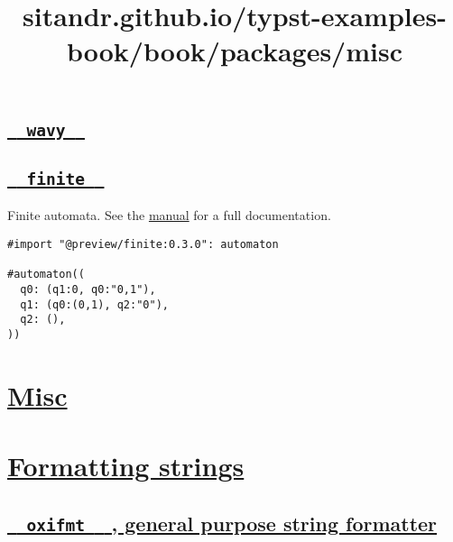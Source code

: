 \pandocbounded{}

\subsection{\texorpdfstring{\hyperref[wavy]{\texttt{\ }{\texttt{\ wavy\ }}\texttt{\ }}}{  wavy  }}\label{wavy}

\subsection{\texorpdfstring{\hyperref[finite]{\texttt{\ }{\texttt{\ finite\ }}\texttt{\ }}}{  finite  }}\label{finite}

Finite automata. See the
\href{https://github.com/jneug/typst-finite/blob/main/manual.pdf}{manual}
for a full documentation.

\begin{verbatim}
#import "@preview/finite:0.3.0": automaton

#automaton((
  q0: (q1:0, q0:"0,1"),
  q1: (q0:(0,1), q2:"0"),
  q2: (),
))
\end{verbatim}

\pandocbounded{}


\title{sitandr.github.io/typst-examples-book/book/packages/misc}

\section{\texorpdfstring{\hyperref[misc]{Misc}}{Misc}}\label{misc}

\section{\texorpdfstring{\hyperref[formatting-strings]{Formatting
strings}}{Formatting strings}}\label{formatting-strings}

\subsection{\texorpdfstring{\hyperref[oxifmt-general-purpose-string-formatter]{\texttt{\ }{\texttt{\ oxifmt\ }}\texttt{\ }
, general purpose string
formatter}}{  oxifmt   , general purpose string formatter}}\label{oxifmt-general-purpose-string-formatter}

